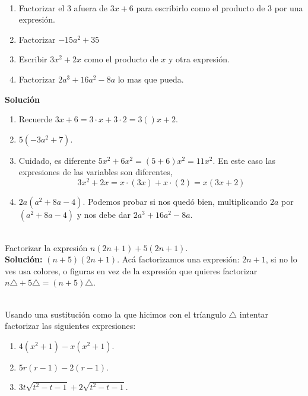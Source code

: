\begin{ejemplo}{\ \\}
	\begin{enumerate}[label=\Alph*)]
		\item Factorizar el 3 afuera de $3x+6$ para escribirlo como el producto de 3 por una expresión.
		\item Factorizar $-15a^2+35$
		\item Escribir $3x^2+2x$ como el producto de $x$ y otra expresión.
		\item Factorizar $2a^3+16a^2-8a$ lo mas que pueda.
	\end{enumerate}
	\textbf{Solución }
	\begin{enumerate}[label=\Alph*)]
		\item Recuerde $3x+6=3\cdot x+3\cdot 2 = 3() x+2$.
		\item $5(-3a^2+7)$.
		\item Cuidado, es diferente $5x^2 + 6x^2=(5+6)x^2=11x^2$. En este caso las expresiones de las variables son diferentes,
		\[3x^2+2x=x\cdot(3x) + x\cdot (2) = x(3x+2)\]
		\item $2a(a^2+8a-4)$. Podemos probar si nos quedó bien, multiplicando $2a$ por $(a^2+8a-4)$ y nos debe dar $2a^3+16a^2-8a$.
	\end{enumerate}
\end{ejemplo}

\begin{ejemplo}{\ \\}
	Factorizar la expresión $n(2n+1) + 5(2n+1)$.\\
	\textbf{Solución: } $(n+5)(2n+1)$. Acá factorizamos una expresión: $2n+1$, si no lo ves usa colores, o figuras en vez de la expresión que quieres factorizar $n\triangle +5\triangle = (n+5)\triangle $.
\end{ejemplo}

\begin{exer}{\ \\}
	Usando una sustitución como la que hicimos con el tríangulo $\triangle $ intentar factorizar las siguientes expresiones:
	\begin{enumerate}[label=\Alph*)]
		\item $4(x^2+1)-x(x^2+1)$.
		\item $5r(r-1)-2(r-1)$.
		\item $3t\sqrt{t^2-t-1}+2\sqrt{t^2-t-1}$.
	\end{enumerate}
\end{exer}

